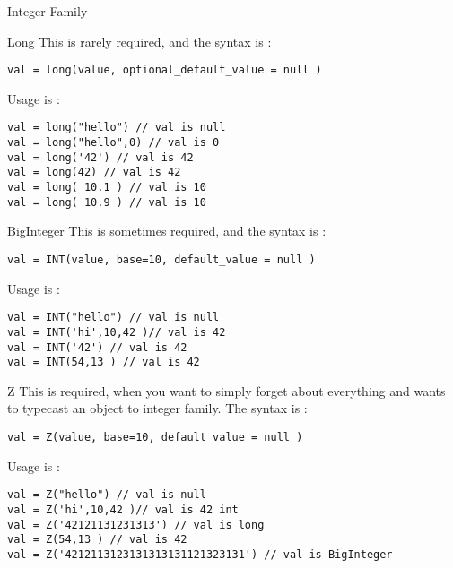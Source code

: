 \begin{section}{Integer Family}
\begin{subsection}{Long}
This is rarely required, and the syntax is :

\begin{lstlisting}[style=JexlStyle]
val = long(value, optional_default_value = null )
\end{lstlisting}

Usage is :

\begin{lstlisting}[style=JexlStyle]
val = long("hello") // val is null
val = long("hello",0) // val is 0
val = long('42') // val is 42 
val = long(42) // val is 42 
val = long( 10.1 ) // val is 10 
val = long( 10.9 ) // val is 10 
\end{lstlisting}

\end{subsection}

\begin{subsection}{BigInteger}
This is sometimes required, and the syntax is :

\begin{lstlisting}[style=JexlStyle]
val = INT(value, base=10, default_value = null )
\end{lstlisting}
Usage is :

\begin{lstlisting}[style=JexlStyle]
val = INT("hello") // val is null
val = INT('hi',10,42 )// val is 42
val = INT('42') // val is 42 
val = INT(54,13 ) // val is 42 
\end{lstlisting}
\end{subsection}

\begin{subsection}{Z}
This is required, when you want to simply
forget about everything and wants to typecast
an object to integer family. 
The syntax is :

\begin{lstlisting}[style=JexlStyle]
val = Z(value, base=10, default_value = null )
\end{lstlisting}

Usage is :

\begin{center}\begin{minipage}{\linewidth}
\begin{lstlisting}[style=JexlStyle]
val = Z("hello") // val is null
val = Z('hi',10,42 )// val is 42 int
val = Z('42121131231313') // val is long 
val = Z(54,13 ) // val is 42 
val = Z('4212113123131313131121323131') // val is BigInteger 
\end{lstlisting}
\end{minipage}\end{center}

\end{subsection}


\end{section}


